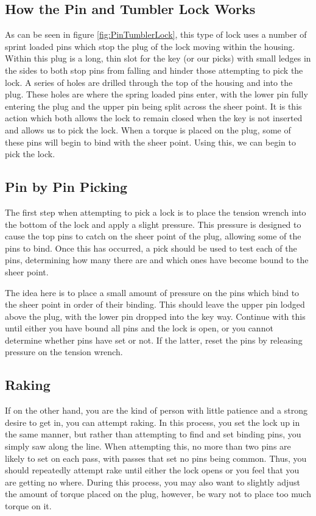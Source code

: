 		\subsection{How the Pin and Tumbler Lock Works}
			As can be seen in figure \ref{fig:PinTumblerLock}, this type of lock uses a number of sprint loaded pins which stop the plug of the lock moving within the housing. 
			Within this plug is a long, thin slot for the key (or our picks) with small ledges in the sides to both stop pins from falling and hinder those attempting to pick the lock. 
			A series of holes are drilled through the top of the housing and into the plug. 
			These holes are where the spring loaded pins enter, with the lower pin fully entering the plug and the upper pin being split across the sheer point. 
			It is this action which both allows the lock to remain closed when the key is not inserted and allows us to pick the lock. 
			When a torque is placed on the plug, some of these pins will begin to bind with the sheer point. 
			Using this, we can begin to pick the lock. 

		\subsection{Pin by Pin Picking}
			The first step when attempting to pick a lock is to place the tension wrench into the bottom of the lock and apply a slight pressure. 
			This pressure is designed to cause the top pins to catch on the sheer point of the plug, allowing some of the pins to bind. 
			Once this has occurred, a pick should be used to test each of the pins, determining how many there are and which ones have become bound to the sheer point. 

			The idea here is to place a small amount of pressure on the pins which bind to the sheer point in order of their binding. 
			This should leave the upper pin lodged above the plug, with the lower pin dropped into the key way. 
			Continue with this until either you have bound all pins and the lock is open, or you cannot determine whether pins have set or not. 
			If the latter, reset the pins by releasing pressure on the tension wrench. 
		\subsection{Raking}
			If on the other hand, you are the kind of person with little patience and a strong desire to get in, you can attempt raking. 
			In this process, you set the lock up in the same manner, but rather than attempting to find and set binding pins, you simply saw along the line. 
			When attempting this, no more than two pins are likely to set on each pass, with passes that set no pins being common. 
			Thus, you should repeatedly attempt rake until either the lock opens or you feel that you are getting no where. 
			During this process, you may also want to slightly adjust the amount of torque placed on the plug, however, be wary not to place too much torque on it. 

